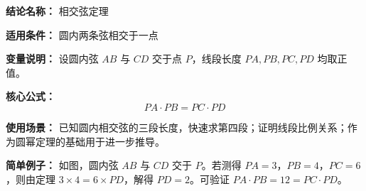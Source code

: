 \textbf{结论名称：} 相交弦定理

\textbf{适用条件：} 圆内两条弦相交于一点

\textbf{变量说明：} 设圆内弦 \(AB\) 与 \(CD\) 交于点 \(P\)，线段长度 \(PA, PB, PC, PD\) 均取正值。

\textbf{核心公式：} \[ \boxed{PA \cdot PB = PC \cdot PD} \]

\textbf{使用场景：} 已知圆内相交弦的三段长度，快速求第四段；证明线段比例关系；作为圆幂定理的基础用于进一步推导。

\textbf{简单例子：} 如图，圆内弦 \(AB\) 与 \(CD\) 交于 \(P\)。若测得 \(PA=3\)，\(PB=4\)，\(PC=6\)，则由定理 \(3 \times 4 = 6 \times PD\)，解得 \(PD = 2\)。可验证 \(PA \cdot PB = 12 = PC \cdot PD\)。